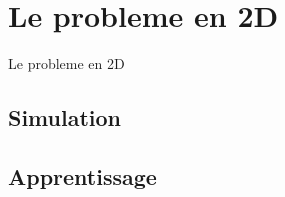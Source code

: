 
% 

\section{Le probleme en 2D}
Le probleme en 2D

\subsection{Simulation}

\subsection{Apprentissage}

% 
